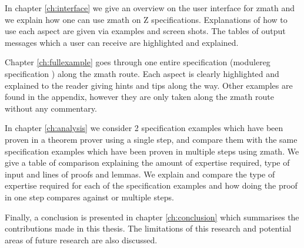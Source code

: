 In chapter \ref{ch:interface} we give an overview on the user interface for \gls{zmath} and we explain how one can use \gls{zmath} on Z specifications. Explanations of how to use each aspect are given via examples and screen shots. The tables of output messages which a user can receive are highlighted and explained.

Chapter \ref{ch:fullexample} goes through one entire specification (modulereg specification \cite{essenceofz}) along the \gls{zmath} route. Each aspect is clearly highlighted and explained to the reader giving hints and tips along the way. Other examples are found in the appendix, however they are only taken along the \gls{zmath} route without any commentary.

In chapter \ref{ch:analysis} we consider 2 specification examples which have been proven in a theorem prover using a single step, and compare them with the same specification examples which have been proven in multiple steps using \gls{zmath}. We give a table of comparison explaining the amount of expertise required, type of input and lines of proofs and lemmas. We explain and compare the type of expertise required for each of the specification examples and how doing the proof in one step compares against or multiple steps.

Finally, a conclusion is presented in chapter \ref{ch:conclusion} which summarises the contributions made in this thesis. The limitations of this research and potential areas of future research are also discussed.
